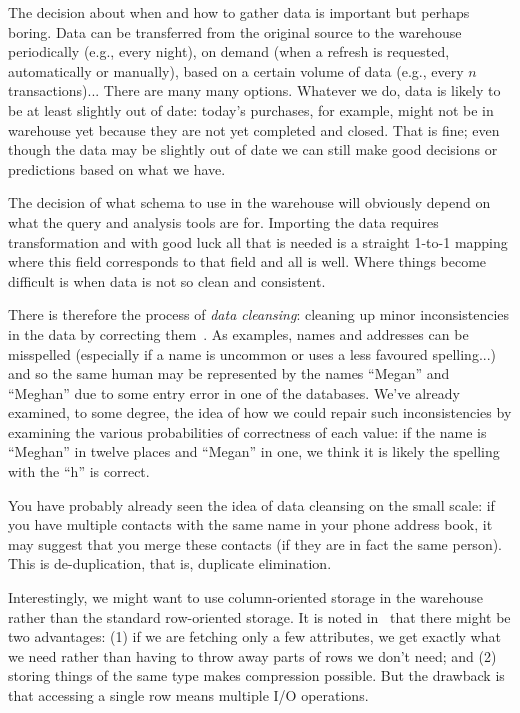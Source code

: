 The decision about when and how to gather data is important but perhaps boring. Data can be transferred from the original source to the warehouse periodically (e.g., every night), on demand (when a refresh is requested, automatically or manually), based on a certain volume of data (e.g., every $n$ transactions)... There are many many options. Whatever we do, data is likely to be at least slightly out of date: today's purchases, for example, might not be in warehouse yet because they are not yet completed and closed. That is fine; even though the data may be slightly out of date we can still make good decisions or predictions based on what we have.

The decision of what schema to use in the warehouse will obviously depend on what the query and analysis tools are for. Importing the data requires transformation and with good luck all that is needed is a straight 1-to-1 mapping where this field corresponds to that field and all is well. Where things become difficult is when data is not so clean and consistent.

There is therefore the process of \textit{data cleansing}: cleaning up minor inconsistencies in the data by correcting them~\cite{dsc}. As examples, names and addresses can be misspelled (especially if a name is uncommon or uses a less favoured spelling...) and so the same human may be represented by the names ``Megan'' and ``Meghan'' due to some entry error in one of the databases. We've already examined, to some degree, the idea of how we could repair such inconsistencies by examining the various probabilities of correctness of each value: if the name is ``Meghan'' in twelve places and ``Megan'' in one, we think it is likely the spelling with the ``h'' is correct.

You have probably already seen the idea of data cleansing on the small scale: if you have multiple contacts with the same name in your phone address book, it may suggest that you merge these contacts (if they are in fact the same person). This is de-duplication, that is, duplicate elimination. 

Interestingly, we might want to use column-oriented storage in the warehouse rather than the standard row-oriented storage. It is noted in~\cite{dsc} that there might be two advantages: (1) if we are fetching only a few attributes, we get exactly what we need rather than having to throw away parts of rows we don't need; and (2) storing things of the same type makes compression possible. But the drawback is that accessing a single row means multiple I/O operations. 

